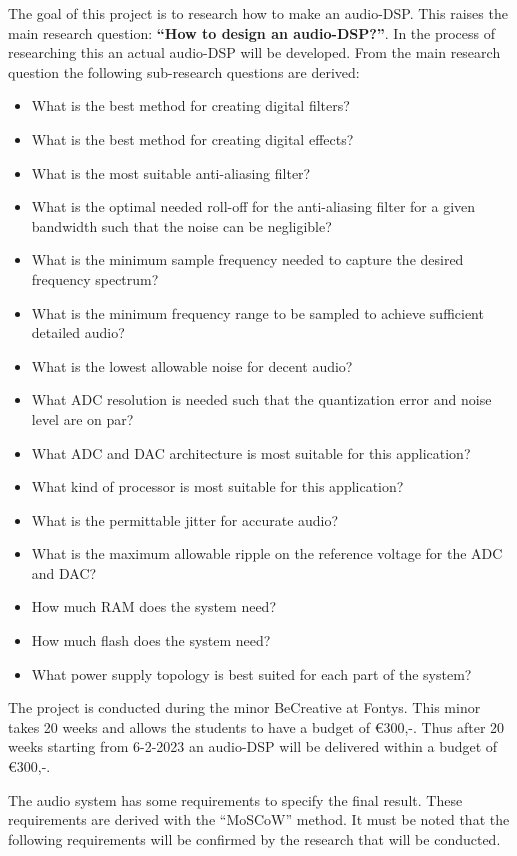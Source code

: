 The goal of this project is to research how to make an audio-DSP. This raises the main research question: \textbf{“How to design an audio-DSP?”}. In the process of researching this an actual audio-DSP will be developed. From the main research question the following sub-research questions are derived:
\begin{itemize} %
	\setlength\itemsep{-0.3em} %
	\item What is the best method for creating digital filters?
	\item What is the best method for creating digital effects?
	\item What is the most suitable anti-aliasing filter?
	\item What is the optimal needed roll-off for the anti-aliasing filter for a given bandwidth such that the noise can be negligible?
	\item What is the minimum sample frequency needed to capture the desired frequency spectrum?
	\item What is the minimum frequency range to be sampled to achieve sufficient detailed audio?
	\item What is the lowest allowable noise for decent audio?
	\item What ADC resolution is needed such that the quantization error and noise level are on par?
	\item What ADC and DAC architecture is most suitable for this application?
	\item What kind of processor is most suitable for this application?
	\item What is the permittable jitter for accurate audio?
	\item What is the maximum allowable ripple on the reference voltage for the ADC and DAC?
	\item How much RAM does the system need?
	\item How much flash does the system need?
	\item What power supply topology is best suited for each part of the system? \\
\end{itemize}

\noindent
The project is conducted during the minor BeCreative at Fontys. This minor takes 20 weeks and allows the students to have a budget of €300,-. Thus after 20 weeks starting from 6-2-2023 an audio-DSP will be delivered within a budget of €300,-.
\par
\noindent
The audio system has some requirements to specify the final result. These requirements are derived with the “MoSCoW” method. It must be noted that the following requirements will be confirmed by the research that will be conducted.


